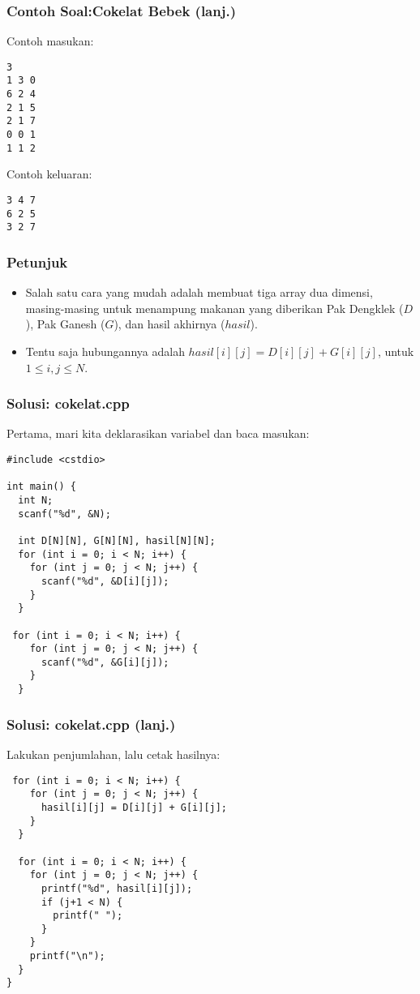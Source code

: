 \begin{frame}[fragile]
\frametitle{Contoh Soal:\newline Cokelat Bebek (lanj.)}
Contoh masukan:
\begin{lstlisting}
3
1 3 0
6 2 4
2 1 5
2 1 7
0 0 1
1 1 2
\end{lstlisting}

\hfill

Contoh keluaran:
\begin{lstlisting}
3 4 7
6 2 5
3 2 7
\end{lstlisting}
\end{frame}

\begin{frame}
\frametitle{Petunjuk}
\begin{itemize}
  \item Salah satu cara yang mudah adalah membuat tiga array dua dimensi, masing-masing untuk menampung makanan yang diberikan Pak Dengklek ($D$), Pak Ganesh ($G$), dan hasil akhirnya ($hasil$).
  \item Tentu saja hubungannya adalah $hasil[i][j] = D[i][j] + G[i][j]$, untuk $1 \le i,j \le N$.
\end{itemize}
\end{frame}

\begin{frame}[fragile]
\frametitle{Solusi: cokelat.cpp}
Pertama, mari kita deklarasikan variabel dan baca masukan:
\begin{lstlisting}
#include <cstdio>

int main() {
  int N;
  scanf("%d", &N);

  int D[N][N], G[N][N], hasil[N][N];
  for (int i = 0; i < N; i++) {
    for (int j = 0; j < N; j++) {
      scanf("%d", &D[i][j]);
    }
  }

 for (int i = 0; i < N; i++) {
    for (int j = 0; j < N; j++) {
      scanf("%d", &G[i][j]);
    }
  }
\end{lstlisting}
\end{frame}

\begin{frame}[fragile]
\frametitle{Solusi: cokelat.cpp (lanj.)}
Lakukan penjumlahan, lalu cetak hasilnya:
\begin{lstlisting}
 for (int i = 0; i < N; i++) {
    for (int j = 0; j < N; j++) {
      hasil[i][j] = D[i][j] + G[i][j];
    }
  }

  for (int i = 0; i < N; i++) {
    for (int j = 0; j < N; j++) {
      printf("%d", hasil[i][j]);
      if (j+1 < N) {
        printf(" ");
      }
    }
    printf("\n");
  }
}
\end{lstlisting}
\end{frame}

